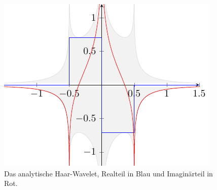 \begin{figure}
	\centering
	\includegraphics{papers/complex/images/haar.pdf}
	\caption{Das analytische Haar-Wavelet, Realteil in Blau und Imaginärteil in Rot. \label{complex:haar}}
\end{figure}